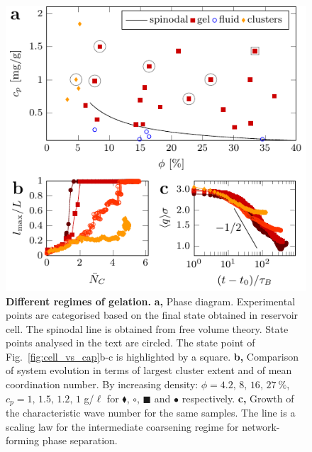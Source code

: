 \documentclass[preprint,footinbib,amsmath,amssymb,superscriptaddress]{revtex4}
\begin{document}
\clearpage 
\begin{figure}
\includegraphics{figs/phasediag.pdf}
\caption{\textbf{Different regimes of gelation.} \textbf{a,} Phase diagram. Experimental points are categorised based on the final state obtained in reservoir cell. The spinodal line is obtained from free volume theory. State points analysed in the text are circled. The state point of Fig.~\ref{fig:cell_vs_cap}b-c is highlighted by a square. \textbf{b,} Comparison of system evolution in terms of largest cluster extent and of mean coordination number. By increasing density: $\phi=4.2,\,8,\,16,\,27~\%$, $c_p=1,\,1.5,\,1.2,\, 1$ g/$\ell$ for 
{$\blacklozenge$}, 
{$\circ$}, 
{\tiny$\blacksquare$} and 
{$\bullet$} respectively. \textbf{c,} Growth of the characteristic wave number for the same samples. 
The line is a scaling law for the intermediate coarsening regime for network-forming phase separation.}
\label{fig:phasediag}
\end{figure}
\end{document}
